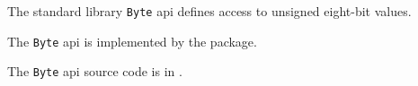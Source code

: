 
The standard library {\tt Byte} api defines access to unsigned eight-bit values.

The {\tt Byte} api is implemented by the  package.

The {\tt Byte} api source code is in .





